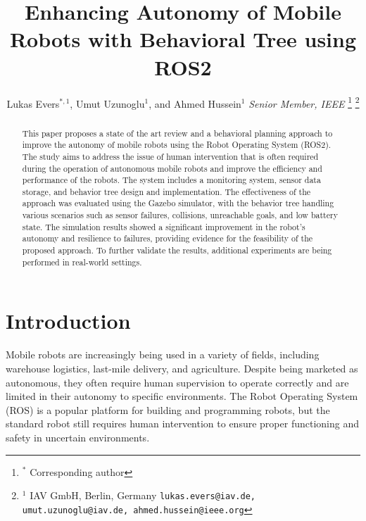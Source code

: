 \documentclass[letterpaper, 10pt, conference]{ieeeconf}
\begin{document}
\title{Enhancing Autonomy of Mobile Robots with Behavioral Tree using ROS2}

\author{Lukas Evers$^{*,1}$, Umut Uzunoglu$^{1}$, and Ahmed Hussein$^{1}$ \textit{Senior Member, IEEE}%
    \thanks{$^{*}$ Corresponding author }%
    \thanks{$^{1}$ IAV GmbH, Berlin, Germany \newline
		{\tt\small lukas.evers@iav.de, umut.uzunoglu@iav.de, ahmed.hussein@ieee.org}}%
}

\maketitle
\pagestyle{empty}


\begin{abstract}

This paper proposes a state of the art review and a behavioral planning approach to improve the autonomy of mobile robots using the Robot Operating System (ROS2). The study aims to address the issue of human intervention that is often required during the operation of autonomous mobile robots and improve the efficiency and performance of the robots. The system includes a monitoring system, sensor data storage, and behavior tree design and implementation. The effectiveness of the approach was evaluated using the Gazebo simulator, with the behavior tree handling various scenarios such as sensor failures, collisions, unreachable goals, and low battery state. The simulation results showed a significant improvement in the robot's autonomy and resilience to failures, providing evidence for the feasibility of the proposed approach. To further validate the results, additional experiments are being performed in real-world settings.

\end{abstract}


\section{Introduction}
\label{sec:Introduction}

Mobile robots are increasingly being used in a variety of fields, including warehouse logistics, last-mile delivery, and agriculture. Despite being marketed as autonomous, they often require human supervision to operate correctly and are limited in their autonomy to specific environments. The Robot Operating System (ROS) is a popular platform for building and programming robots, but the standard robot still requires human intervention to ensure proper functioning and safety in uncertain environments.
\end{document}
